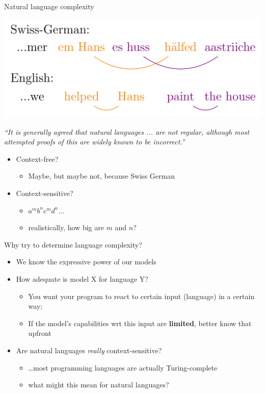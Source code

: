 \documentclass{beamer}
\begin{document}
\begin{frame}{Natural language complexity}

\includegraphics[width=\textwidth]{figures/swiss}

{\small \it ``It is generally agreed that natural languages ... are
  not regular, although most attempted proofs of this are widely known
  to be incorrect.''}

\small
\begin{itemize}
\item Context-free?
\begin{itemize}
\item Maybe, but maybe not, because Swiss German
\end{itemize}
\item Context-sensitive?
\begin{itemize}
\item $a^mb^nc^md^n...$
\item realistically, how big are $m$ and $n$?
\end{itemize}

\end{itemize}


\end{frame}

\begin{frame}{Why try to determine language complexity?}
  \begin{itemize}
  \item We know the expressive power of our models
  \item How adequate is model X for language Y?
    \begin{itemize}
    \item You want your program to react to certain input (language) in a certain way;
    \item If the model's capabilities wrt this input are {\bf limited}, better know that upfront
    \end{itemize}
  \item Are natural languages {\it really} context-sensitive?
    \begin{itemize}
    \item \ldots most programming languages are actually Turing-complete
    \item what might this mean for natural languages?
    \end{itemize}
  \end{itemize}
\end{frame}
\end{document}
